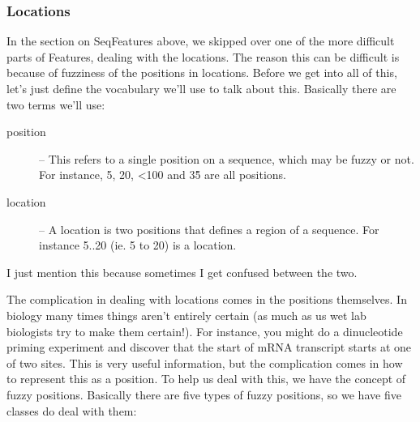 \documentclass{report}
\begin{document}
\subsubsection{Locations}
\label{sec:locations}

In the section on SeqFeatures above, we skipped over one of the more difficult parts of Features, dealing with the locations. The reason this can be difficult is because of fuzziness of the positions in locations. Before we get into all of this, let's just define the vocabulary we'll use to talk about this. Basically there are two terms we'll use:

\begin{description}
  \item[position] -- This refers to a single position on a sequence, which may be fuzzy or not. For instance, 5, 20, <100 and 3\^5 are all positions.

  \item[location] -- A location is two positions that defines a region of a sequence. For instance 5..20 (ie. 5 to 20) is a location.
\end{description}

I just mention this because sometimes I get confused between the two.


The complication in dealing with locations comes in the positions themselves. In biology many times things aren't entirely certain (as much as us wet lab biologists try to make them certain!). For instance, you might do a dinucleotide priming experiment and discover that the start of mRNA transcript starts at one of two sites. This is very useful information, but the complication comes in how to represent this as a position. To help us deal with this, we have the concept of fuzzy positions. Basically there are five types of fuzzy positions, so we have five classes do deal with them:
\end{document}
